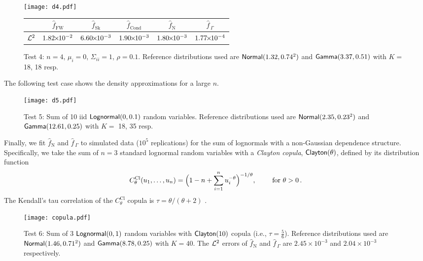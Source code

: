 \begin{figure}[H]
\centering
\texttt{[image: d4.pdf]}

\vspace{4mm}

\begin{tabular}{c|c|c|c|c|c|}
\cline{2-6}
                         & $\widehat{f}_{\mathrm{FW}}$  & $\widehat{f}_{\mathrm{Sk}}$ & $\widehat{f}_{\mathrm{Cond}}$ & $\widehat{f}_{\mathrm{N}}$  & $\widehat{f}_{\,\Gamma}$ \\ \hline
\multicolumn{1}{|c|}{$\mathcal{L}^2$} & $1.82 {\mkern-2mu\times\mkern-2mu} 10^{-2}$ & $6.60 {\mkern-2mu\times\mkern-2mu} 10^{-3}$ & $1.90 {\mkern-2mu\times\mkern-2mu} 10^{-3}$ & $1.80 {\mkern-2mu\times\mkern-2mu} 10^{-3}$ & $1.77 {\mkern-2mu\times\mkern-2mu} 10^{-4}$ \\ \hline
\end{tabular}
\caption*{Test 4: $n=4$, $\mu_i = 0$, $\Sigma_{ii}=1$, $\rho = 0.1$. Reference distributions used are $\mathsf{Normal}(1.32,0.74^2)$ and $\mathsf{Gamma}(3.37,0.51)$ with $K =$ 18, 18 resp.}
\end{figure}

The following test case shows the density approximations for a large $n$.

\begin{figure}[H]
\centering
\texttt{[image: d5.pdf]}
\caption*{Test 5: Sum of 10 iid $\mathsf{Lognormal}(0,0.1)$ random variables. Reference distributions used are $\mathsf{Normal}(2.35,0.23^2)$ and $\mathsf{Gamma}(12.61,0.25)$ with $K =$ 18, 35 resp.}
\end{figure}


Finally, we fit $\widehat{f}_{\mathrm{N}}$ and $\widehat{f}_{\,\Gamma}$ to simulated data ($10^5$ replications) for the sum of lognormals with a non-Gaussian dependence structure. Specifically, we take the sum of $n = 3$ standard lognormal random variables with a \emph{Clayton copula}, $\mathsf{Clayton}(\theta)$, defined by its distribution function
\[
C^{\mathrm{Cl}}_\theta(u_1, \dots, u_n) = \Bigl( 1 - n + \sum_{i=1}^n u_i^{-\theta} \Bigr)^{-1/\theta}, \qquad \text{ for } \theta > 0 \,.
\]
The Kendall's tau correlation of the $C^{\mathrm{Cl}}_\theta$ copula is $\tau = \theta / (\theta + 2)$ \cite{mcneil2015quantitative}.

\begin{figure}
\centering
\texttt{[image: copula.pdf]}
\caption*{Test 6: Sum of 3 $\mathsf{Lognormal}(0,1)$ random variables with $\mathsf{Clayton}(10)$ copula (i.e., $\tau = \frac56$). Reference distributions used are $\mathsf{Normal}(1.46,0.71^2)$ and $\mathsf{Gamma}(8.78,0.25)$ with $K = 40$. The $\mathcal{L}^2$ errors of $\widehat{f}_{\mathrm{N}}$ and $\widehat{f}_{\,\Gamma}$ are $2.45 \times 10^{-3}$ and $2.04 \times 10^{-3}$ respectively.}
\end{figure}


